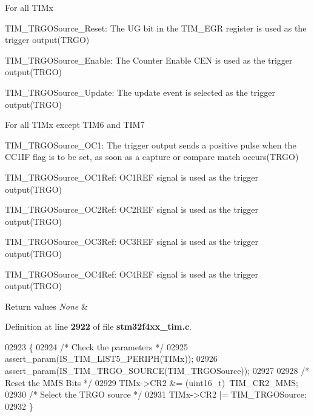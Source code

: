 \begin{DoxyItemize}
\item For all T\+I\+Mx \begin{DoxyItemize}
\item T\+I\+M\+\_\+\+T\+R\+G\+O\+Source\+\_\+\+Reset\+: The UG bit in the T\+I\+M\+\_\+\+E\+GR register is used as the trigger output(\+T\+R\+G\+O) \item T\+I\+M\+\_\+\+T\+R\+G\+O\+Source\+\_\+\+Enable\+: The Counter Enable C\+EN is used as the trigger output(\+T\+R\+G\+O) \item T\+I\+M\+\_\+\+T\+R\+G\+O\+Source\+\_\+\+Update\+: The update event is selected as the trigger output(\+T\+R\+G\+O)\end{DoxyItemize}

\item For all T\+I\+Mx except T\+I\+M6 and T\+I\+M7 \begin{DoxyItemize}
\item T\+I\+M\+\_\+\+T\+R\+G\+O\+Source\+\_\+\+O\+C1\+: The trigger output sends a positive pulse when the C\+C1\+IF flag is to be set, as soon as a capture or compare match occurs(\+T\+R\+G\+O) \item T\+I\+M\+\_\+\+T\+R\+G\+O\+Source\+\_\+\+O\+C1\+Ref\+: O\+C1\+R\+EF signal is used as the trigger output(\+T\+R\+G\+O) \item T\+I\+M\+\_\+\+T\+R\+G\+O\+Source\+\_\+\+O\+C2\+Ref\+: O\+C2\+R\+EF signal is used as the trigger output(\+T\+R\+G\+O) \item T\+I\+M\+\_\+\+T\+R\+G\+O\+Source\+\_\+\+O\+C3\+Ref\+: O\+C3\+R\+EF signal is used as the trigger output(\+T\+R\+G\+O) \item T\+I\+M\+\_\+\+T\+R\+G\+O\+Source\+\_\+\+O\+C4\+Ref\+: O\+C4\+R\+EF signal is used as the trigger output(\+T\+R\+G\+O)\end{DoxyItemize}

\begin{DoxyRetVals}{Return values}
{\em None} & \\
\hline
\end{DoxyRetVals}

\end{DoxyItemize}

Definition at line \textbf{ 2922} of file \textbf{ stm32f4xx\+\_\+tim.\+c}.


\begin{DoxyCode}
02923 \{
02924   \textcolor{comment}{/* Check the parameters */}
02925   assert_param(IS_TIM_LIST5_PERIPH(TIMx));
02926   assert_param(IS_TIM_TRGO_SOURCE(TIM\_TRGOSource));
02927 
02928   \textcolor{comment}{/* Reset the MMS Bits */}
02929   TIMx->CR2 &= (uint16\_t)~TIM_CR2_MMS;
02930   \textcolor{comment}{/* Select the TRGO source */}
02931   TIMx->CR2 |=  TIM\_TRGOSource;
02932 \}
\end{DoxyCode}
\mbox{\label{group__TIM__Group7_ga2f19ce1d90990691cf037e419ba08003}} 
